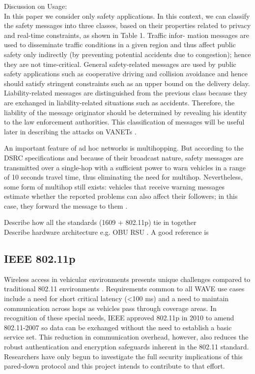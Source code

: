 
Discussion on Usage:\\
In this paper we consider only safety applications. In this context, we can classify the safety messages into three classes, based on their properties related to privacy and real-time constraints, as shown in Table 1. Traffic infor-
mation messages are used to disseminate traffic conditions in a given region and thus affect public safety only indirectly (by preventing potential accidents due to congestion); hence they are not time-critical. General safety-related messages are used by public safety applications such as cooperative driving and collision avoidance and
hence should satisfy stringent constraints such as an upper bound on the delivery delay. Liability-related messages are distinguished from the previous class because they are exchanged in liability-related situations such as accidents. Therefore, the liability of the message originator should be determined by revealing his identity to
the law enforcement authorities. This classification of messages will be useful later in describing the attacks on VANETs \cite{raya2007securing}.

An important feature of ad hoc networks is multihopping. But according to the DSRC specifications and because of their broadcast nature, safety messages are transmitted over a single-hop with a sufficient power to warn vehicles in a range of 10 seconds travel time, thus eliminating the need for multihop. Nevertheless, some form of multihop still exists: vehicles that receive warning messages estimate whether the reported problems can also affect their followers; in this case, they forward the message to them \cite{raya2007securing}.

Describe how all the standards (1609 + 802.11p) tie in together\\

Describe hardware architecture e.g. OBU RSU . A good reference is \cite{laurendeau2006threats}\\

\subsection{IEEE 802.11p}
Wireless access in vehicular environments presents unique challenges compared to traditional 802.11 environments \cite{karagiannis2011vehicular}. Requirements common to all WAVE use cases include a need for short critical latency (\textless 100 ms) and a need to maintain communication across hops as vehicles pass through coverage areas. In recognition of these special needs, IEEE approved 802.11p in 2010 to amend 802.11-2007 \cite{ieee11802} so data can be exchanged without the need to establish a basic service set. This reduction in communication overhead, however, also reduces the robust authentication and encryption safeguards inherent in the 802.11 standard. Researchers have only begun to investigate the full security implications of this pared-down protocol and this project intends to contribute to that effort.

